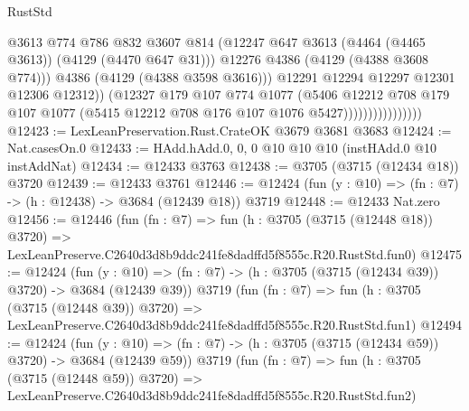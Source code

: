 \begin{lexlean}{RustStd}
\begin{coremodule}
                                      @3613
                                      @774
                                      @786
                                      @832
                                      @3607
                                      @814
                                      (@12247
                                        @647
                                        @3613
                                        (@4464 (@4465 @3613))
                                        (@4129 (@4470 @647 @31)))
                                      @12276
                                      @4386
                                      (@4129 (@4388 @3608 @774)))
                                    @4386
                                    (@4129 (@4388 @3598 @3616)))
                                  @12291
                                  @12294
                                  @12297
                                  @12301
                                  @12306
                                  @12312))
                              (@12327
                                @179
                                @107
                                @774
                                @1077
                                (@5406
                                  @12212
                                  @708
                                  @179
                                  @107
                                  @1077
                                  (@5415 @12212 @708 @176 @107 @1076 @5427))))))))))))))))
@12423 := LexLeanPreservation.Rust.CrateOK @3679 @3681 @3683
@12424 := Nat.casesOn.{0}
@12433 := HAdd.hAdd.{0, 0, 0} @10 @10 @10 (instHAdd.{0} @10 instAddNat)
@12434 := @12433 @3763
@12438 := @3705 (@3715 (@12434 @18)) @3720
@12439 := @12433 @3761
@12446 := @12424 (fun (y : @10) => (fn : @7) -> (h : @12438) -> @3684 (@12439 @18)) @3719
@12448 := @12433 Nat.zero
@12456 := @12446
    (fun (fn : @7) =>
    fun (h : @3705 (@3715 (@12448 @18)) @3720) =>
    LexLeanPreserve.C2640d3d8b9ddc241fe8dadffd5f8555c.R20.RustStd.fun0)
@12475 := @12424
    (fun (y : @10) => (fn : @7) -> (h : @3705 (@3715 (@12434 @39)) @3720) -> @3684 (@12439 @39))
    @3719
    (fun (fn : @7) =>
    fun (h : @3705 (@3715 (@12448 @39)) @3720) =>
    LexLeanPreserve.C2640d3d8b9ddc241fe8dadffd5f8555c.R20.RustStd.fun1)
@12494 := @12424
    (fun (y : @10) => (fn : @7) -> (h : @3705 (@3715 (@12434 @59)) @3720) -> @3684 (@12439 @59))
    @3719
    (fun (fn : @7) =>
    fun (h : @3705 (@3715 (@12448 @59)) @3720) =>
    LexLeanPreserve.C2640d3d8b9ddc241fe8dadffd5f8555c.R20.RustStd.fun2)

\end{coremodule}
\end{lexlean}
